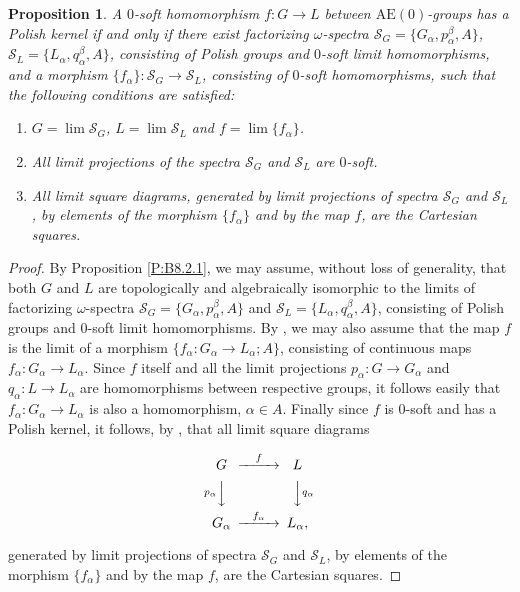 \documentclass[12pt,draft]{amsart}
\theoremstyle{plain}
\newtheorem{pro}[thm]{Proposition}
\theoremstyle{definition}
\numberwithin{equation}{section}
\begin{document}
\begin{pro}\label{P:polishkernel}
A $0$-soft homomorphism $f \colon G \to L$ between $\text{AE}(0)$-groups
has a Polish kernel
if and only if there exist factorizing $\omega$-spectra\;
${\mathcal S}_{G} = \{ G_{\alpha}, p_{\alpha}^{\beta}, A \}$,
${\mathcal S}_{L} = \{ L_{\alpha}, q_{\alpha}^{\beta}, A \}$,
consisting of Polish groups and $0$-soft limit homomorphisms, and
a morphism 
$\{ f_{\alpha} \} \colon {\mathcal S}_{G} \to {\mathcal S}_{L}$,
consisting of $0$-soft homomorphisms, such that the following
conditions are satisfied:
\begin{enumerate}
\item
$G = \lim{\mathcal S}_{G}$, $L = \lim{\mathcal S}_{L}$ and
$f = \lim \{ f_{\alpha} \}$.
\item
All limit projections of the spectra ${\mathcal S}_{G}$ and
${\mathcal S}_{L}$ are $0$-soft.
\item
All limit square diagrams, generated by limit projections of
spectra ${\mathcal S}_{G}$ and ${\mathcal S}_{L}$, by elements
of the morphism $\{ f_{\alpha} \}$ and by the map $f$, are the
Cartesian squares.
\end{enumerate}
\end{pro}
\begin{proof}
By Proposition \ref{P:B8.2.1}, we may assume, without loss of
generality, that
both $G$ and $L$ are topologically and algebraically isomorphic
to the limits of factorizing $\omega$-spectra
${\mathcal S}_{G} = \{ G_{\alpha}, p_{\alpha}^{\beta}, A \}$
and ${\mathcal S}_{L} = \{ L_{\alpha}, q_{\alpha}^{\beta}, A \}$,
consisting of Polish groups and $0$-soft limit homomorphisms.
By \cite[Theorem 1.3.6]{chibook96}, we may also assume that the
map
$f$ is the limit of a morphism
$\{ f_{\alpha} \colon G_{\alpha} \to L_{\alpha} ; A\}$,
consisting of continuous maps
$f_{\alpha} \colon G_{\alpha} \to L_{\alpha}$.
Since $f$ itself and all the limit projections
$p_{\alpha} \colon G \to G_{\alpha}$ and
$q_{\alpha} \colon L \to L_{\alpha}$ are homomorphisms
between respective groups, it follows easily that
$f_{\alpha} \colon G_{\alpha} \to L_{\alpha}$ is
also a homomorphism, $\alpha \in A$. Finally since $f$ is
$0$-soft and has a Polish kernel, it follows, by 
\cite[Theorem 6.3.1(vi)]{chibook96}, that all limit square diagrams


\[
\begin{CD}
G @>f>> L\\
@V{p_{\alpha}}VV @VV{q_{\alpha}}V\\
G_{\alpha} @>f_{\alpha}>> L_{\alpha},
\end{CD}
\]
\bigskip

\noindent generated by limit projections of
spectra ${\mathcal S}_{G}$ and ${\mathcal S}_{L}$, by elements
of the morphism $\{ f_{\alpha} \}$ and by the map $f$, are the
Cartesian squares.
\end{proof}
\end{document}
